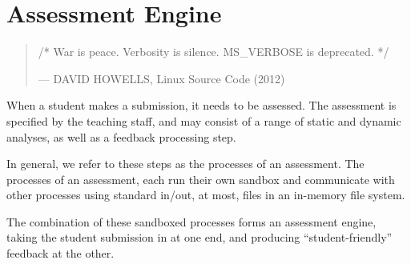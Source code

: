 
\chapter{Assessment Engine}

\begin{quotation}

\footnotesize\sffamily\itshape

\begin{flushright}

/* War is peace. Verbosity is silence. MS\_VERBOSE is deprecated. */

\smallbreak

\upshape

--- DAVID HOWELLS, Linux Source Code (2012)

\end{flushright}

\end{quotation}

When a student makes a submission, it needs to be assessed. The
assessment is specified by the teaching staff, and may consist of a range of
static and dynamic analyses, as well as a feedback processing step.

In general, we refer to these steps as the processes of an assessment. The
processes of an assessment, each run their own sandbox and communicate with
other processes using standard in/out, at most, files in an in-memory file
system. 

The combination of these sandboxed processes forms an assessment engine, taking
the student submission in at one end, and producing ``student-friendly''
feedback at the other.

